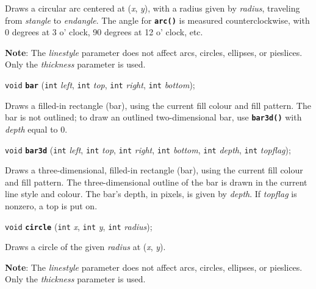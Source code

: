 \documentclass[a4paper,12pt]{article}
\newcommand{\V}{\texttt{void}}      %
\newcommand{\I}{\texttt{int}}       %
\newcommand{\func}[1]{\textbf{\texttt{#1}}}  %
\newcommand{\A}[1]{\emph{#1}}       %
\newenvironment{bgi}
{ %
  \begin{snugshade}
}
{ %
  \end{snugshade}
}
\begin{document}
Draws a circular arc centered at (\A{x}, \A{y}), with a radius given
by \A{radius}, traveling from \A{stangle} to \A{endangle}. The angle
for \func{arc()} is measured counterclockwise, with 0 degrees at 3 o'
clock, 90 degrees at 12 o' clock, etc.

\textbf{Note}: The \A{linestyle} parameter does not affect arcs,
circles, ellipses, or pie\-slices. Only the \A{thickness} parameter is
used.


\label{sec:bar}

\begin{bgi}
\V{} \func{bar} (\I{} \A{left}, \I{} \A{top}, \I{} \A{right}, \I{}
\A{bottom});
\end{bgi}

Draws a filled-in rectangle (bar), using the current fill colour and
fill pattern. The bar is not outlined; to draw an outlined
two-dimensional bar, use \func{bar3d()} with \A{depth} equal to 0.


\label{sec:bar3d}

\begin{bgi}
\V{} \func{bar3d} (\I{} \A{left}, \I{} \A{top}, \I{} \A{right}, \I{}
\A{bottom}, \I{} \A{depth}, \I{} \A{topflag});
\end{bgi}

Draws a three-dimensional, filled-in rectangle (bar), using the
current fill colour and fill pattern. The three-dimensional outline of
the bar is drawn in the current line style and colour. The bar's
depth, in pixels, is given by \A{depth}. If \A{topflag} is nonzero, a
top is put on.


\label{sec:circle}

\begin{bgi}
\V{} \func{circle} (\I{} \A{x}, \I{} \A{y}, \I{} \A{radius});
\end{bgi}

Draws a circle of the given \A{radius} at (\A{x}, \A{y}).

\textbf{Note}: The \A{linestyle} parameter does not affect arcs,
circles, ellipses, or pie\-slices. Only the \A{thickness} parameter is
used.


\label{sec:cleardevice}
\end{document}
